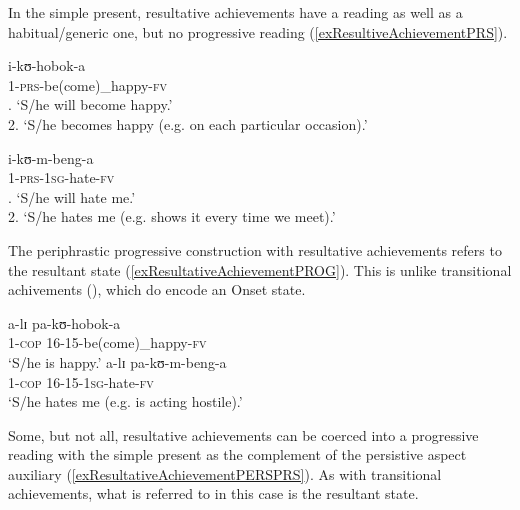 In the simple present, resultative achievements have a  reading as well as a habitual/generic one, but no progressive reading (\ref{exResultiveAchievementPRS}).

\begin{exe}
\ex \label{exResultiveAchievementPRS} \begin{xlist}
\ex \gll i-kʊ-hobok-a\\
1-\textsc{prs}-be(come)\_happy-\textsc{fv}\\
. `S/he will become happy.'\\2. `S/he becomes happy (e.g. on each particular occasion).' 

\ex \gll i-kʊ-m-beng-a\\
1-\textsc{prs}-\textsc{1sg}-hate-\textsc{fv}\\
. \lq S/he will hate me.'\\
2. \lq S/he hates me (e.g. shows it every time we meet).'

\end{xlist}
\end{exe}

The periphrastic progressive construction with resultative achievements refers to the resultant state (\ref{exResultativeAchievementPROG}). This is unlike transitional achivements (), which do encode an Onset state. 
\begin{exe}
\ex \label{exResultativeAchievementPROG}\begin{xlist}
\ex\gll a-lɪ pa-kʊ-hobok-a\\
1-\textsc{cop} 16-15-be(come)\_happy-\textsc{fv}\\
\glt `S/he is happy.'
\ex \gll a-lɪ pa-kʊ-m-beng-a\\
1-\textsc{cop} 16-15-\textsc{1sg}-hate-\textsc{fv}\\
\glt \lq S/he hates me (e.g. is acting hostile).'
\end{xlist}
\end{exe}

Some, but not all, resultative achievements can be coerced into a progressive reading with the simple present as the complement of the persistive aspect auxiliary (\ref{exResultativeAchievementPERSPRS}). As with transitional achievements, what is referred to in this case is the resultant state.

